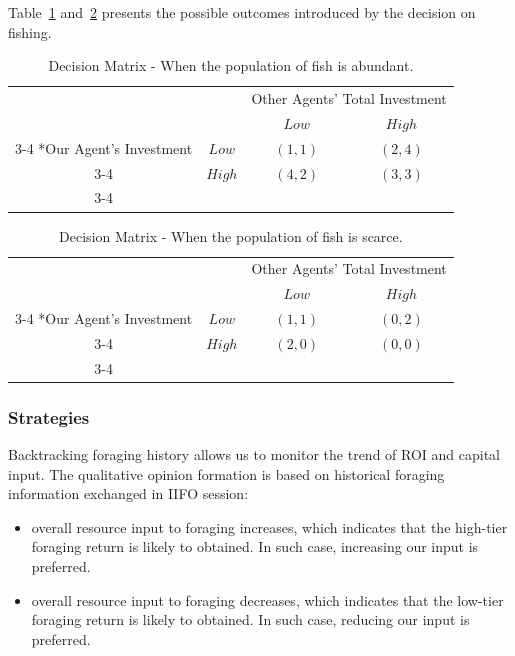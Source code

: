 Table~\ref{table:FishAbundant} and~\ref{table:FishScarce} presents the possible outcomes introduced by the decision on fishing. 

\begin{table}[!htb]
    \setlength{\extrarowheight}{2pt}
    \begin{tabular}{cc|c|c|}
      & \multicolumn{1}{c}{} & \multicolumn{2}{c}{Other Agents' Total Investment}\\
      & \multicolumn{1}{c}{} & \multicolumn{1}{c}{$Low$}  & \multicolumn{1}{c}{$High$} \\\cline{3-4}
      \multirow{2}*{Our Agent's Investment}  & $Low$ & $(1,1)$ & $(2,4)$ \\\cline{3-4}
      & $High$ & $(4,2)$ & $(3,3)$ \\\cline{3-4}
    \end{tabular}
    \caption{Decision Matrix - When the population of fish is abundant.}\label{table:FishAbundant}
\end{table}

\begin{table}[!htb]
    \setlength{\extrarowheight}{2pt}
    \begin{tabular}{cc|c|c|}
      & \multicolumn{1}{c}{} & \multicolumn{2}{c}{Other Agents' Total Investment}\\
      & \multicolumn{1}{c}{} & \multicolumn{1}{c}{$Low$}  & \multicolumn{1}{c}{$High$} \\\cline{3-4}
      \multirow{2}*{Our Agent's Investment}  & $Low$ & $(1,1)$ & $(0,2)$ \\\cline{3-4}
      & $High$ & $(2,0)$ & $(0,0)$ \\\cline{3-4}
    \end{tabular}
    \caption{Decision Matrix - When the population of fish is scarce.}\label{table:FishScarce}
\end{table}
\subsubsection{Strategies} \label{subsubsec:Team6_Foraging:Strategies}
Backtracking foraging history allows us to monitor the trend of ROI and capital input. The qualitative opinion formation is based on historical foraging information exchanged in IIFO session: 
\begin{itemize}
    \item overall resource input to foraging increases, which indicates that the high-tier foraging return is likely to obtained. In such case, increasing our input is preferred.
    \item overall resource input to foraging decreases, which indicates that the low-tier foraging return is likely to obtained. In such case, reducing our input is preferred.
\end{itemize}

